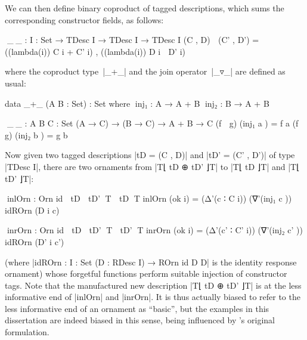We can then define binary coproduct of tagged descriptions, which sums the corresponding constructor fields, as follows:
\begin{code}
^^^_⊕_ : {I : Set} → TDesc I → TDesc I → TDesc I
(C , D) ⊕ (C' , D') = ((lambda(i)) C i + C' i) , ((lambda(i)) D i ▿ D' i)
\end{code}
where the coproduct type~|_+_| and the join operator~|_▿_| are defined as usual:
\begin{code}
data _+_ (A B : Set) : Set where
  ^^^inj₁  : A → A + B
  ^^^inj₂  : B → A + B

^^^_▿_ : {A B C : Set} (A → C) → (B → C) → A + B → C
(f ▿ g) (inj₁  a  ) = f a
(f ▿ g) (inj₂  b  ) = g b
\end{code}
Now given two tagged descriptions |tD = (C , D)| and |tD' = (C' , D')| of type |TDesc I|, there are two ornaments from |T⌊ tD ⊕ tD' ⌋T| to |T⌊ tD ⌋T| and |T⌊ tD' ⌋T|:
\begin{code}
^^^inlOrn  : Orn id ⌊ tD ⊕ tD' ⌋T ⌊ tD ⌋T
inlOrn   (ok i) = (Δ'(c   ∶ C i))   (∇'(inj₁  c   ))  idROrn (D i c)

^^^inrOrn  : Orn id ⌊ tD ⊕ tD' ⌋T ⌊ tD' ⌋T
inrOrn   (ok i) = (Δ'(c'  ∶ C' i))  (∇'(inj₂  c'  ))  idROrn (D' i c')
\end{code}
(where |idROrn : {I : Set} (D : RDesc I) → ROrn id D D| is the identity response ornament) whose forgetful functions perform suitable injection of constructor tags.
Note that the manufactured new description |T⌊ tD ⊕ tD' ⌋T| is at the less informative end of |inlOrn| and |inrOrn|.
It is thus actually biased to refer to the less informative end of an ornament as ``basic'', but the examples in this dissertation are indeed biased in this sense, being influenced by \citeauthor{McBride-ornaments}'s original formulation.

